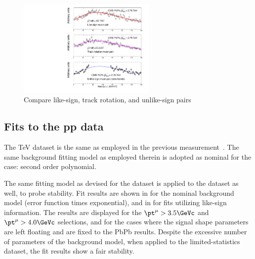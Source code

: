 \begin{figure}[h!]
 \begin{center}
    \includegraphics[angle=0,width=0.6\textwidth]{figures/fitting/plot3canvas.pdf}
    \caption{Compare like-sign, track rotation, and unlike-sign pairs}
    \label{fig:compareBkgd}
 \end{center}
\end{figure}

\subsection{Fits to the pp data}

The  TeV dataset is the same as employed in the previous measurement~\cite{prl}. 
The same background fitting model as employed therein is adopted as nominal for the \pp case: 
second order polynomial. 


The same fitting model as devised for the \PbPb dataset is applied to the \pp dataset as well, to probe stability.  
Fit results are shown in  for the nominal background model (error function times exponential), 
and in  for fits utilizing like-sign information. 
The results are displayed for the $\pt^\mu>3.5\GeVc$ and $\pt^\mu>4.0\GeVc$ selections, 
and for the cases where the signal shape parameters are left floating and are fixed to the PbPb results.  
%
Despite the excessive number of parameters of the background model, when applied to the limited-statistics \pp dataset, the fit results show a fair stability. 


